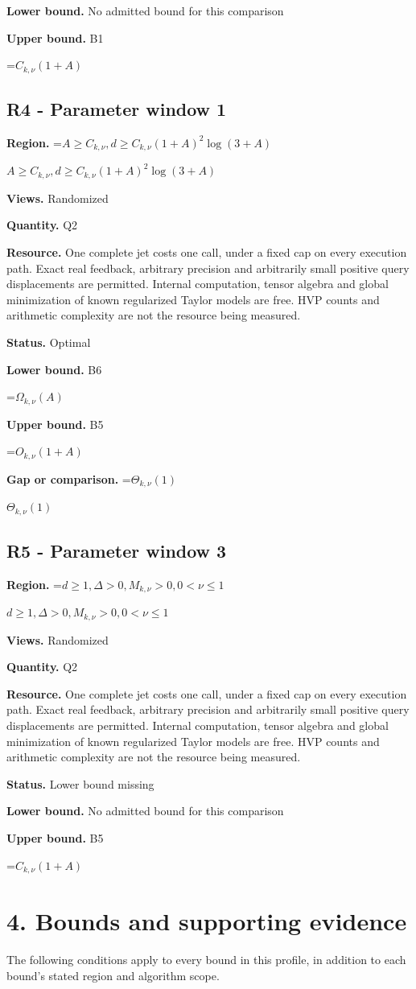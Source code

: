 \documentclass[10pt,a4paper]{article}
\newcommand{\AtlasMath}[1]{\par\begingroup\centering\setbox0=\hbox{$\displaystyle #1$}\ifdim\wd0>1.4\linewidth\typeout{ATLAS WIDE FORMULA: \the\wd0}\fi\ifdim\wd0>\linewidth\resizebox{\linewidth}{!}{\box0}\else\box0\fi\par\endgroup}
\newcommand{\AtlasInlineMath}[1]{\begingroup\setbox0=\hbox{$#1$}\ifdim\wd0>.4\linewidth\endgroup\AtlasMath{#1}\else\endgroup$#1$\fi}
\begin{document}
\textbf{Lower bound.} No admitted bound for this comparison

\textbf{Upper bound.} B1

\AtlasMath{C_{k,\nu}(1+A)}
\subsection{R4 - Parameter window 1}
\textbf{Region.} \AtlasInlineMath{A\ge C_{k,\nu},d\ge C_{k,\nu}(1+A)^2 \log(3+A)}

\textbf{Views.} Randomized

\textbf{Quantity.} Q2

\textbf{Resource.} One complete jet costs one call, under a fixed cap on every execution path. Exact real feedback, arbitrary precision and arbitrarily small positive query displacements are permitted. Internal computation, tensor algebra and global minimization of known regularized Taylor models are free. HVP counts and arithmetic complexity are not the resource being measured.

\textbf{Status.} Optimal

\textbf{Lower bound.} B6

\AtlasMath{\Omega_{k,\nu}(A)}
\textbf{Upper bound.} B5

\AtlasMath{O_{k,\nu}(1+A)}
\textbf{Gap or comparison.} \AtlasInlineMath{\Theta_{k,\nu}(1)}

\subsection{R5 - Parameter window 3}
\textbf{Region.} \AtlasInlineMath{d\ge 1,\Delta>0,M_{k,\nu}>0,0<\nu\le 1}

\textbf{Views.} Randomized

\textbf{Quantity.} Q2

\textbf{Resource.} One complete jet costs one call, under a fixed cap on every execution path. Exact real feedback, arbitrary precision and arbitrarily small positive query displacements are permitted. Internal computation, tensor algebra and global minimization of known regularized Taylor models are free. HVP counts and arithmetic complexity are not the resource being measured.

\textbf{Status.} Lower bound missing

\textbf{Lower bound.} No admitted bound for this comparison

\textbf{Upper bound.} B5

\AtlasMath{C_{k,\nu}(1+A)}
\section{4. Bounds and supporting evidence}
The following conditions apply to every bound in this profile, in addition to each bound's stated region and algorithm scope.
\end{document}
